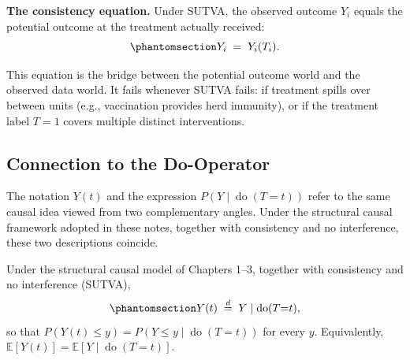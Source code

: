 \documentclass[
  a4paper,
]{book}
\newcommand{\doop}{\operatorname{do}}
\newcommand{\E}{\mathbb{E}}
\begin{document}
\textbf{The consistency equation.} Under SUTVA, the observed outcome
\(Y_i\) equals the potential outcome at the treatment actually received:
\begin{equation}\protect\phantomsection\label{eq-consistency}{Y_i \;=\; Y_i(T_i).}\end{equation}

This equation is the bridge between the potential outcome world and the
observed data world. It fails whenever SUTVA fails: if treatment spills
over between units (e.g., vaccination provides herd immunity), or if the
treatment label \(T=1\) covers multiple distinct interventions.

\subsection{Connection to the
Do-Operator}\label{connection-to-the-do-operator}

The notation \(Y(t)\) and the expression \(P(Y \mid \doop(T{=}t))\)
refer to the same causal idea viewed from two complementary angles.
Under the structural causal framework adopted in these notes, together
with consistency and no interference, these two descriptions coincide.

\begin{tcolorbox}[enhanced jigsaw, arc=.35mm, bottomrule=.15mm, bottomtitle=1mm, breakable, colback=white, colbacktitle=quarto-callout-tip-color!10!white, colframe=quarto-callout-tip-color-frame, coltitle=black, left=2mm, leftrule=.75mm, opacityback=0, opacitybacktitle=0.6, rightrule=.15mm, title={Proposition: Potential Outcomes and the Do-Operator}, titlerule=0mm, toprule=.15mm, toptitle=1mm]

Under the structural causal model of Chapters 1--3, together with
consistency and no interference (SUTVA),
\begin{equation}\protect\phantomsection\label{eq-po-do}{Y(t) \;\overset{d}{=}\; Y \mid \doop(T{=}t),}\end{equation}
so that \(P(Y(t) \le y) = P(Y \le y \mid \doop(T{=}t))\) for every
\(y\). Equivalently, \(\E[Y(t)] = \E[Y \mid \doop(T{=}t)]\).

\end{tcolorbox}
\end{document}
